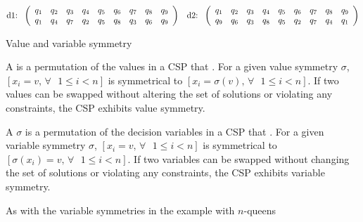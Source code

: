 \documentclass{cons-beamer}
\begin{document}
\begin{frame}
\begin{example}[Continued]
\[\begin{array}{@{}ll@{}}
    \makebox[2em][l]{\text{d1:}} 
      \left(
      \begin{array}{ccccccccc}
      q_1 & q_2 & q_3 & q_4 & q_5 & q_6 & q_7 & q_8 & q_9 \\
      q_1 & q_4 & q_7 & q_2 & q_5 & q_8 & q_3 & q_6 & q_9
      \end{array}
      \right) &
    \makebox[2em][l]{\text{d2:}} 
      \left(
      \begin{array}{ccccccccc}
      q_1 & q_2 & q_3 & q_4 & q_5 & q_6 & q_7 & q_8 & q_9 \\
      q_9 & q_6 & q_3 & q_8 & q_5 & q_2 & q_7 & q_4 & q_1
      \end{array}
      \right)
    \end{array}
    \]
  \end{example}
\end{frame}

\begin{frame}{Value and variable symmetry}
  \begin{definition}
    A  is a permutation of the values in a CSP that . For a given value symmetry $\sigma$, $[x_i = v \text{, } \forall \text{ } 1 \leq i < n]$ is symmetrical to $[x_i = \sigma(v) \text{, } \forall \text{ } 1 \leq i < n]$. If two values can be swapped without altering the set of solutions or violating any constraints, the CSP exhibits value symmetry.
  \end{definition}
  \vfill

  \begin{definition}
    A  $\sigma$ is a permutation of the decision variables in a CSP that . For a given variable symmetry $\sigma$, $[x_i = v \text{, } \forall \text{ } 1 \leq i < n]$ is symmetrical to $[\sigma(x_i) = v \text{, } \forall \text{ } 1 \leq i < n]$.
    If two variables can be swapped without changing the set of solutions or violating any constraints, the CSP exhibits variable symmetry.
  \end{definition}

  As with the variable symmetries in the example with $n$-queens 
\end{frame}
\end{document}
